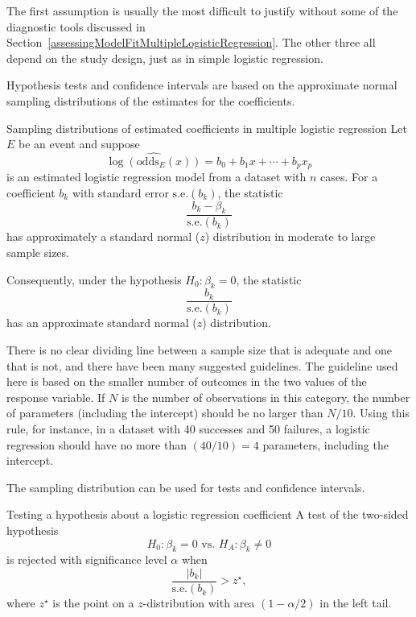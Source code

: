 The first assumption is usually the most difficult to justify without some of the diagnostic tools discussed in Section~\ref{assessingModelFitMultipleLogisticRegression}.  The other three all depend on the study design, just as in simple logistic regression.

Hypothesis tests and confidence intervals are based on the approximate normal sampling distributions of the estimates for the coefficients.


\begin{onebox}{Sampling distributions of estimated coefficients in multiple logistic regression}
Let $E$ be an event and suppose
\[
  \widehat{\log(\textrm{odds}_{E}(x))} = b_0 + b_1 x + \cdots + b_p x_p
\]
is an estimated logistic regression model from a dataset with $n$ cases.  For a coefficient $b_k$ with standard error $\text{s.e.}(b_k)$, the statistic
\[
      \frac{b_k - \beta_k}{\textrm{s.e.}(b_k)}
\]
has approximately a standard normal ($z$) distribution in moderate to large sample sizes.

Consequently, under the hypothesis $H_0: \beta_k = 0$, the statistic
\[
      \frac{b_k}{\textrm{s.e.}(b_k)}
\]
has an approximate standard normal ($z$) distribution.
\end{onebox}

There is no clear dividing line between a sample size that is adequate and one that is not, and there have been many suggested guidelines.  The guideline used here is based on the  smaller number of outcomes in the two values of the response variable.  If $N$ is the number of observations in this category, the number of parameters (including the intercept) should be no larger than $N/10$.    Using this rule, for instance, in a dataset with 40 successes and 50 failures, a logistic regression should have no more than $(40/10) = 4$ parameters, including the intercept.

The sampling distribution can be used for tests and confidence intervals.


\begin{onebox}{Testing a hypothesis about a logistic regression coefficient}
A test of the two-sided hypothesis
\[
  H_0: \beta_k = 0 \text{ vs. } H_A: \beta_k \ne 0
\]
is rejected with significance level $\alpha$ when
\[
     \frac{|b_k|}{\textrm{s.e.}(b_k)} > z^\star,
\]
where $z^\star$ is the point on a $z$-distribution with area $(1 - \alpha/2)$ in the left tail.
\end{onebox}

